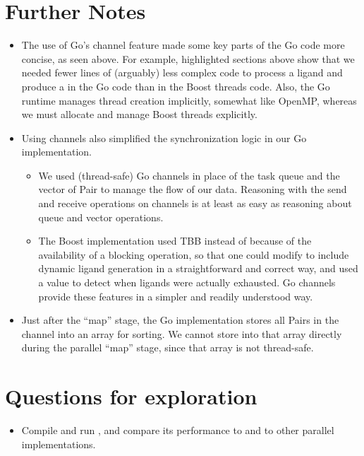 \documentclass[letterpaper,10pt,openany,oneside]{sphinxmanual}
\begin{document}
\section{Further Notes}
\label{go/go:further-notes}\begin{itemize}
\item {} 
The use of Go’s channel feature made some key parts of the Go code more concise, as seen above. For example, highlighted sections above show that we needed fewer lines of (arguably) less complex code to process a ligand and produce a  in the Go code than in the Boost threads code. Also, the Go runtime manages thread creation implicitly, somewhat like OpenMP, whereas we must allocate and manage Boost threads explicitly.

\item {} 
Using channels also simplified the synchronization logic in our Go implementation.
\begin{itemize}
\item {} 
We used (thread-safe) Go channels in place of the task queue  and the vector of Pair  to manage the flow of our data. Reasoning with the send and receive operations on channels is at least as easy as reasoning about queue and vector operations.

\item {} 
The Boost implementation used TBB  instead of  because of the availability of a blocking  operation, so that one could modify  to include dynamic ligand generation in a straightforward and correct way, and used a value  to detect when ligands were actually exhausted. Go channels provide these features in a simpler and readily understood way.

\end{itemize}

\item {} 
Just after the “map” stage, the Go implementation stores all Pairs in the channel  into an array for sorting. We cannot store into that array directly during the parallel “map” stage, since that array is not thread-safe.

\end{itemize}


\section{Questions for exploration}
\label{go/go:questions-for-exploration}\begin{itemize}
\item {} 
Compile and run , and compare its performance to  and to other parallel implementations.

\end{itemize}
\end{document}
